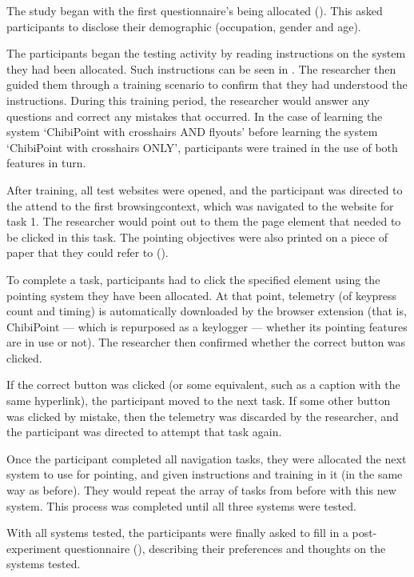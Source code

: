 \documentclass[11pt,openright,a4paper]{report}
\begin{document}
The study began with the first questionnaire's being allocated (). This asked participants to disclose their demographic (occupation, gender and age).

The participants began the testing activity by reading instructions on the system they had been allocated. Such instructions can be seen in . The researcher then guided them through a training scenario to confirm that they had understood the instructions. During this training period, the researcher would answer any questions and correct any mistakes that occurred. In the case of learning the system `ChibiPoint with crosshairs AND flyouts' before learning the system `ChibiPoint with crosshairs ONLY', participants were trained in the use of both features in turn.

After training, all test websites were opened, and the participant was directed to the attend to the first \gls{browsingcontext}, which was navigated to the website for task 1. The researcher would point out to them the page element that needed to be clicked in this task. The pointing objectives were also printed on a piece of paper that they could refer to ().

To complete a task, participants had to click the specified element using the pointing system they have been allocated. At that point, telemetry (of keypress count and timing) is automatically downloaded by the browser extension (that is, ChibiPoint --- which is repurposed as a keylogger --- whether its pointing features are in use or not). The researcher then confirmed whether the correct button was clicked.

If the correct button was clicked (or some equivalent, such as a caption with the same hyperlink), the participant moved to the next task. If some other button was clicked by mistake, then the telemetry was discarded by the researcher, and the participant was directed to attempt that task again.

Once the participant completed all navigation tasks, they were allocated the next system to use for pointing, and given instructions and training in it (in the same way as before). They would repeat the array of tasks from before with this new system. This process was completed until all three systems were tested.

With all systems tested, the participants were finally asked to fill in a post-experiment questionnaire (), describing their preferences and thoughts on the systems tested.
\end{document}

